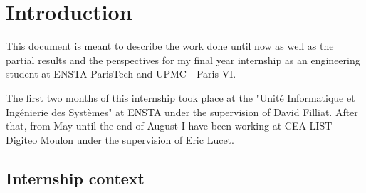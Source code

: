 
\pagestyle{fancy}
\fancyhead{}
\fancyhead[RE,LO]{\leftmark} %
\fancyfoot{}
\fancyfoot[OR,EL]{\thepage}


\pagestyle{plain}
\clearpage\null\newpage
{}
\pagestyle{fancy}
\section{Introduction}
\setcounter{page}{3}


This document is meant to describe the work done until now as well as the partial results and the perspectives for my final year internship as an engineering student at ENSTA ParisTech and UPMC - Paris VI.

The first two months of this internship took place at the "Unité Informatique et Ingénierie des Systèmes" at ENSTA under the supervision of David Filliat. After that, from May until the end of August I have been working at CEA LIST Digiteo Moulon under the supervision of Eric Lucet.

\subsection{Internship context}

